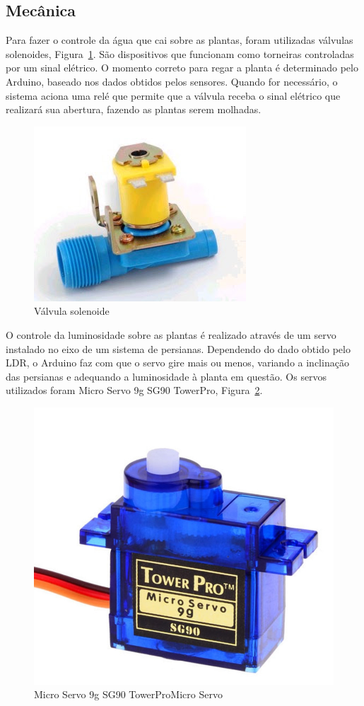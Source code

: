 \documentclass[a4paper,12pt]{report}
\begin{document}
			
		
		\subsection{Mecânica}
			Para fazer o controle da água que cai sobre as plantas, foram utilizadas válvulas solenoides, Figura~\ref{fig:VALVULA}. São dispositivos que funcionam como torneiras controladas por um sinal elétrico. O momento correto para regar a planta é determinado pelo Arduino, baseado nos dados obtidos pelos sensores. Quando for necessário, o sistema aciona uma relé que permite que a válvula receba o sinal elétrico que realizará sua abertura, fazendo as plantas serem molhadas.	
			
			\begin{figure}[!h]
				\centering
				\includegraphics[width=0.4\linewidth]{figs/valvula}
				\caption{Válvula solenoide}
				\label{fig:VALVULA}
			\end{figure}
		
			O controle da luminosidade sobre as plantas é realizado através de um servo instalado no eixo de um sistema de persianas. Dependendo do dado obtido pelo LDR, o Arduino faz com que o servo gire mais ou menos, variando a inclinação das persianas e adequando a luminosidade à planta em questão. Os servos utilizados foram Micro Servo 9g SG90 TowerPro, Figura~\ref{fig:SERVO}. 
			
				
			\begin{figure}[!h]
				\centering
				\includegraphics[width=0.4\linewidth]{figs/servo}
				\caption{Micro Servo 9g SG90 TowerProMicro Servo}
				\label{fig:SERVO}
			\end{figure}
		
\end{document}
